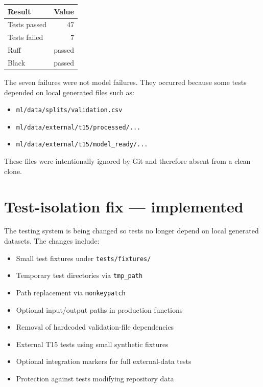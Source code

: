 \documentclass[11pt,a4paper]{article}
\begin{document}
\begin{center}
\begin{tabular}{lr}
\toprule
\textbf{Result} & \textbf{Value} \\
\midrule
Tests passed           & 47 \\
Tests failed           & 7 \\
Ruff                   & passed \\
Black                  & passed \\
\bottomrule
\end{tabular}
\end{center}

\noindent The seven failures were not model failures. They occurred because
some tests depended on local generated files such as:

\begin{itemize}[leftmargin=2em,itemsep=2pt]
  \item \texttt{ml/data/splits/validation.csv}
  \item \texttt{ml/data/external/t15/processed/...}
  \item \texttt{ml/data/external/t15/model\_ready/...}
\end{itemize}

\noindent These files were intentionally ignored by Git and therefore
absent from a clean clone.

\section{Test-isolation fix --- implemented}

The testing system is being changed so tests no longer depend on local
generated datasets. The changes include:

\begin{itemize}[leftmargin=2em,itemsep=2pt]
  \item Small test fixtures under \texttt{tests/fixtures/}
  \item Temporary test directories via \texttt{tmp\_path}
  \item Path replacement via \texttt{monkeypatch}
  \item Optional input/output paths in production functions
  \item Removal of hardcoded validation-file dependencies
  \item External T15 tests using small synthetic fixtures
  \item Optional integration markers for full external-data tests
  \item Protection against tests modifying repository data
\end{itemize}
\end{document}
